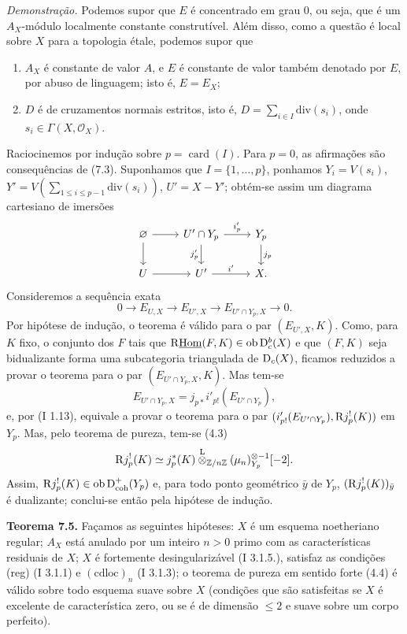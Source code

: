 \emph{Demonstração.} Podemos supor que $E$ é concentrado em grau $0$, ou seja, que é um $A_X$-módulo localmente constante construtível. Além disso, como a questão é local sobre $X$ para a topologia étale, podemos supor que
\begin{enumerate}[label=(\alph*)]
\item $A_X$ é constante de valor $A$, e $E$ é constante de valor também denotado por $E$, por abuso de linguagem; isto é, $E=E_X$;
\item $D$ é de cruzamentos normais estritos, isto é, $D=\sum_{i\in I}\mathrm{div}(s_i)$, onde $s_i\in\Gamma(X,\mathcal{O}_X)$.
\end{enumerate}
Raciocinemos por indução sobre $p=\operatorname{card}(I)$. Para $p=0$, as afirmações são consequências de (7.3). Suponhamos que $I=\{1,\ldots,p\}$, ponhamos $Y_i=V(s_i)$, $Y'=V(\sum_{1\leq i\leq p-1}\mathrm{div}(s_i))$, $U'=X-Y'$; obtém-se assim um diagrama cartesiano de imersões
\[
\begin{tikzcd}
\varnothing \arrow[r] \arrow[d] & U'\cap Y_p \arrow[r,"i'_p"] \arrow[d,"j'_p"'] & Y_p \arrow[d,"j_p"]\\
U \arrow[r] & U' \arrow[r,"i'"] & X.
\end{tikzcd}
\]
Consideremos a sequência exata
\[
        0\longrightarrow E_{U,X}\longrightarrow E_{U',X}\longrightarrow E_{U'\cap Y_p,X}\longrightarrow0.
\]
Por hipótese de indução, o teorema é válido para o par $(E_{U',X},K)$. Como, para $K$ fixo, o conjunto dos $F$ tais que $\mathrm{R}\underline{\operatorname{Hom}}(F,K)\in\operatorname{ob}\mathrm{D}_c^b(X)$ e que $(F,K)$ seja bidualizante forma uma subcategoria triangulada de $\mathrm{D}_c(X)$, ficamos reduzidos a provar o teorema para o par $(E_{U'\cap Y_p,X},K)$. Mas tem-se
\[
        E_{U'\cap Y_p,X}=j_{p*}i'_{p!}(E_{U'\cap Y_p}),
\]
e, por (I 1.13), equivale a provar o teorema para o par $(i'_{p!}(E_{U'\cap Y_p}),\mathrm{R} j_p^!(K))$ em $Y_p$. Mas, pelo teorema de pureza, tem-se (4.3)
\[
        \mathrm{R} j_p^!(K)\simeq j_p^*(K)\overset{\mathrm L}{\otimes}_{\mathbb{Z}/n\mathbb{Z}}(\mu_n)_{Y_p}^{\otimes -1}[-2].
\]
Assim, $\mathrm{R} j_p^!(K)\in\operatorname{ob}\mathrm{D}^{+}_{\mathrm{coh}}(Y_p)$ e, para todo ponto geométrico $\bar{y}$ de $Y_p$, $(\mathrm{R} j_p^!(K))_{\bar{y}}$ é dualizante; conclui-se então pela hipótese de indução.

\textbf{Teorema 7.5.} Façamos as seguintes hipóteses: $X$ é um esquema noetheriano regular; $A_X$ está anulado por um inteiro $n>0$ primo com as características residuais de $X$; $X$ é fortemente desingularizável (I 3.1.5.), satisfaz as condições (reg) (I 3.1.1) e $(\mathrm{cdloc})_n$ (I 3.1.3); o teorema de pureza em sentido forte (4.4) é válido sobre todo esquema suave sobre $X$ (condições que são satisfeitas se $X$ é excelente de característica zero, ou se é de dimensão $\leq2$ e suave sobre um corpo perfeito).

